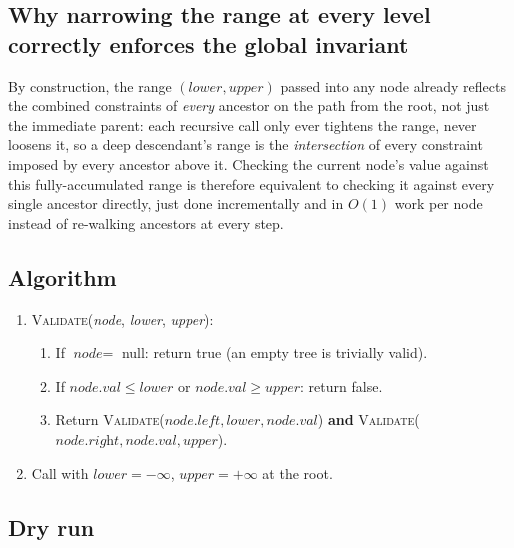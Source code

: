 \subsection*{Why narrowing the range at every level correctly enforces the global invariant}

By construction, the range $(\textit{lower}, \textit{upper})$ passed into
any node already reflects the combined constraints of \emph{every}
ancestor on the path from the root, not just the immediate parent: each
recursive call only ever tightens the range, never loosens it, so a deep
descendant's range is the \emph{intersection} of every constraint imposed
by every ancestor above it. Checking the current node's value against
this fully-accumulated range is therefore equivalent to checking it
against every single ancestor directly, just done incrementally and in
$O(1)$ work per node instead of re-walking ancestors at every step.

\subsection*{Algorithm}

\begin{enumerate}
  \item \textsc{Validate}(\textit{node}, \textit{lower}, \textit{upper}):
  \begin{enumerate}
    \item If $\textit{node} = $ null: return true (an empty tree is
          trivially valid).
    \item If $\textit{node}.\textit{val} \le \textit{lower}$ or
          $\textit{node}.\textit{val} \ge \textit{upper}$: return
          false.
    \item Return
          \textsc{Validate}($\textit{node}.\textit{left}, \textit{lower},
          \textit{node}.\textit{val}$) \textbf{and}
          \textsc{Validate}($\textit{node}.\textit{right},
          \textit{node}.\textit{val}, \textit{upper}$).
  \end{enumerate}
  \item Call with $\textit{lower}=-\infty$, $\textit{upper}=+\infty$ at
        the root.
\end{enumerate}

\subsection*{Dry run}


